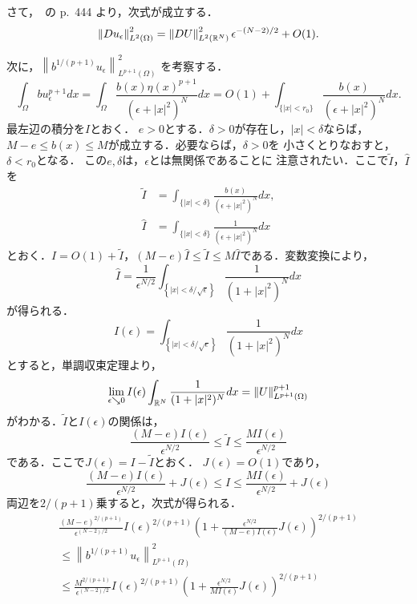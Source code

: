さて，\cite{MR709644}~の p.~444 より，次式が成立する．
\begin{equation}
 \left\| Du_\epsilon \right\|_{L^2(\Omega)}^2 
  = \left\| DU \right\|_{L^2(\mathbb{R}^N)}^2 \epsilon^{-(N-2)/2} + O(1).
  \label{eq:Duepsilon}
\end{equation}

次に，$\left\| b^{1/(p+1)} u_\epsilon \right\|_{L^{p+1}(\Omega)}^2$
を考察する．
\[
 \int_\Omega b u_{\epsilon}^{p+1} dx
 = \int_\Omega \frac{b(x) \eta(x)^{p+1}}{(\epsilon + \lvert x
 \rvert^2)^N} dx 
 = O(1) + \int_{ \{ \lvert x \rvert < r_0 \} } 
 \frac{b(x)}{(\epsilon + \lvert x
 \rvert^2)^N} dx.
\]
最左辺の積分を$I$とおく．
$e > 0$とする．$\delta > 0$が存在し，$\lvert x \rvert < \delta$ならば，
$M - e \leq b(x) \leq M$が成立する．必要ならば，$\delta > 0$を
小さくとりなおすと，$\delta < r_0$となる．
この$e, \delta$は，$\epsilon$とは無関係であることに
注意されたい．ここで$\tilde{I}$，$\hat{I}$を
\begin{align*}
 \tilde{I} &= \int_{ \{ \lvert x \rvert < \delta \} } 
 \frac{b(x)}{(\epsilon + \lvert x
 \rvert^2)^N} dx, \\
 \hat{I} &= \int_{ \{ \lvert x \rvert < \delta \} } 
 \frac{1}{(\epsilon + \lvert x
 \rvert^2)^N} dx
\end{align*}
とおく．$I = O(1) + \tilde{I}$，$(M - e) \hat{I}
 \leq \tilde{I} \leq M \hat{I}$である．変数変換により，
\[
 \hat{I} 
 = \frac{1}{\epsilon^{N/2}} \int_{ \left\{ \lvert x \rvert <
 \delta/\sqrt{\epsilon} \right\}} \frac{1}{(1 + \lvert x
 \rvert^2)^N}dx
\]
が得られる．
\[
 I(\epsilon) = \int_{ \left\{ \lvert x \rvert <
 \delta/\sqrt{\epsilon} \right\}} \frac{1}{(1 + \lvert x
 \rvert^2)^N} dx
\]
とすると，単調収束定理より，
\[
 \lim_{\epsilon \searrow 0} I(\epsilon)
 \int_{\mathbb{R}^N} \frac{1}{(1 + \lvert x
 \rvert^2)^N} dx = \left\| U \right\|_{L^{p+1}(\Omega)}^{p+1}
\]
がわかる．$\tilde{I}$と$I(\epsilon)$の関係は，
\[
 \frac{(M - e)I(\epsilon)}{\epsilon^{N/2}} \leq \tilde{I} \leq \frac{M
 I(\epsilon)}{\epsilon^{N/2}}
\]
である．ここで$J(\epsilon) = I - \tilde{I}$とおく．
$J(\epsilon) = O(1)$であり，
\[
 \frac{(M - e)I(\epsilon)}{\epsilon^{N/2}} + J(\epsilon)
 \leq I \leq \frac{M
 I(\epsilon)}{\epsilon^{N/2}} + J(\epsilon)
\]
両辺を$2/(p+1)$乗すると，次式が得られる．
\begin{multline}
 \frac{(M -e)^{2/(p+1)}}{\epsilon^{(N-2)/2}} I(\epsilon)^{2/(p+1)}
 \left( 1 + \frac{\epsilon^{N/2}}{(M-e)I(\epsilon)} J(\epsilon)
 \right)^{2/(p+1)}  \\  \leq  \left\| b^{1/(p+1)} u_\epsilon
 \right\|^2_{L^{p+1}(\Omega)}  \\ \leq
 \frac{M^{2/(p+1)}}{\epsilon^{(N-2)/2}} I(\epsilon)^{2/(p+1)}
 \left( 1 + \frac{\epsilon^{N/2}}{MI(\epsilon)} J(\epsilon)
 \right)^{2/(p+1)} \label{eq:2/p+1pow} 
\end{multline}
